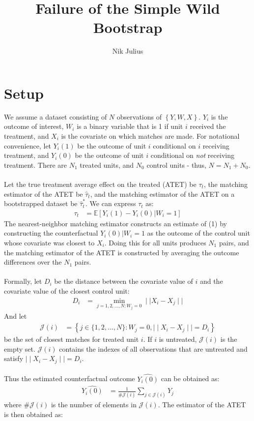 \documentclass[10pt,letterpaper]{article}
\author{Nik Julius}
\title{Failure of the Simple Wild Bootstrap}
\begin{document}
\maketitle

\section{Setup}

We assume a dataset consisting of $N$ observations of $\left\{Y, W, X\right\}$. $Y_i$ is the outcome of interest, $W_i$ is a binary variable that is 1 if unit $i$ received the treatment, and $X_i$ is the covariate on which matches are made. For notational convenience, let $Y_i(1)$ be the outcome of unit $i$ conditional on $i$ receiving treatment, and $Y_i(0)$ be the outcome of unit $i$ conditional on \textit{not} receiving treatment. There are $N_1$ treated units, and $N_0$ control units - thus, $N = N_1 + N_0$.\\ \\
Let the true treatment average effect on the treated (ATET) be $\tau_t$, the matching estimator of the ATET be $\hat{\tau}_t$, and the matching estimator of the ATET on a bootstrapped dataset be $\hat{\tau}^*_t$. We can express $\tau_t$ as:
\begin{align}
\tau_t &= \mathbb{E} \left[ Y_i(1) - Y_i(0) | W_i = 1 \right]
\end{align}
The nearest-neighbor matching estimator constructs an estimate of (1) by constructing the counterfactual $Y_i(0)|W_i = 1$ as the outcome of the control unit whose covariate was closest to $X_i$. Doing this for all units produces $N_1$ pairs, and the matching estimator of the ATET is constructed by averaging the outcome differences over the $N_1$ pairs.\\ \\
Formally, let $D_i$ be the distance between the covariate value of $i$ and the covariate value of the closest control unit:
\begin{align}
D_i &= \min_{j = 1,2,...,N: W_j = 0} \mid \mid X_i - X_j \mid \mid
\end{align}
And let
\begin{align}
\mathcal{J}(i) &= \left\{j \in \{1, 2, ..., N \} : W_j = 0, \mid \mid X_i - X_j \mid \mid = D_i \right\}
\end{align}
be the set of closest matches for treated unit $i$. If $i$ is untreated, $\mathcal{J}(i)$ is the empty set. $\mathcal{J}(i)$ contains the indexes of all observations that are untreated and satisfy $\mid\mid X_i - X_j \mid\mid = D_i$.\\ \\
Thus the estimated counterfactual outcome $\widehat{Y_i(0)}$ can be obtained as:
\begin{align}
\widehat{Y_i(0)} &= \frac{1}{\# \mathcal{J}(i)} \sum_{j \in \mathcal{J}(i)} Y_j
\end{align}
where $\#\mathcal{J}(i)$ is the number of elements in $\mathcal{J}(i)$. The estimator of the ATET is then obtained as:
\end{document}
